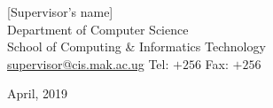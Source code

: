 \begin{titlepage}
\begin{center}
[Supervisor's name]\\
\vspace{1em}
Department of Computer Science\\
School of Computing \& Informatics Technology \\
\url{supervisor@cis.mak.ac.ug} Tel: $+256$ Fax: $+256$


\vfill

April, 2019

\end{center}

\end{titlepage}

